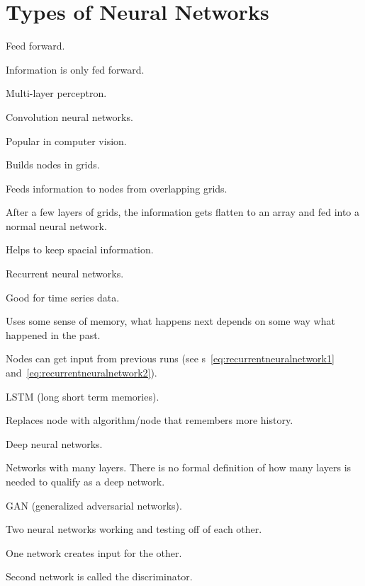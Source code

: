 	\section{Types of Neural Networks}
	\begin{bulletedlist}
		\item Feed forward.
		\begin{bulletedlist}
			\item Information is only fed forward.
			\item Multi-layer perceptron.
			\item Convolution neural networks.
			\begin{bulletedlist}
				\item Popular in computer vision.
				\item Builds nodes in grids.
				\item Feeds information to nodes from overlapping grids.
				\item After a few layers of grids, the information gets flatten to an array and fed into a normal neural network.
				\item Helps to keep spacial information.
			\end{bulletedlist}
		\end{bulletedlist}
		\item Recurrent neural networks.
		\begin{bulletedlist}
			\item Good for time series data.
			\item Uses some sense of memory, what happens next depends on some way what happened in the past.
			\item Nodes can get input from previous runs (see \equationname{}s~\ref{eq:recurrentneuralnetwork1} and~\ref{eq:recurrentneuralnetwork2}).
			\item 
			\item LSTM (long short term memories).
			\begin{bulletedlist}
				\item Replaces node with algorithm/node that remembers more history.
			\end{bulletedlist}
		\end{bulletedlist}
		\item Deep neural networks.
		\begin{bulletedlist}
			\item Networks with many layers.  There is no formal definition of how many layers is needed to qualify as a deep network.
		\end{bulletedlist}
		\item GAN (generalized adversarial networks).
		\begin{bulletedlist}
			\item Two neural networks working and testing off of each other.
			\item One network creates input for the other.
			\item Second network is called the discriminator.
		\end{bulletedlist}
	\end{bulletedlist}

